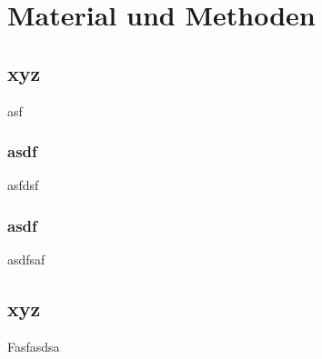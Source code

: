 \chapter{Material und Methoden}




\section{xyz}

asf


\subsection{asdf}

asfdsf

\subsection{asdf}

asdfsaf



\section{xyz}

Fasfasdsa

